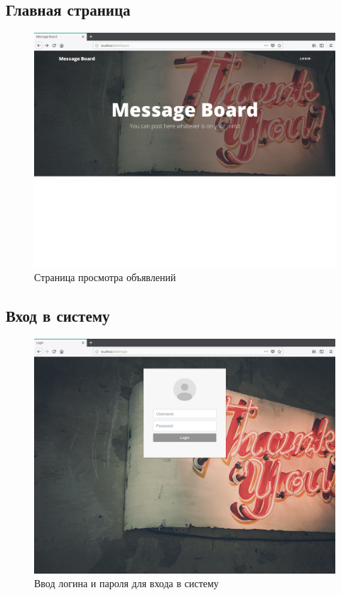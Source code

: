 \documentclass{article}
\begin{document}
    \subsection{Главная страница}
    \begin{figure}[H]
        \begin{flushleft}
            \centerline{\includegraphics[scale=0.4]{board_guest.png}}
            \caption{Страница просмотра объявлений}
        \end{flushleft}
    \end{figure}

    \subsection{Вход в систему}
    \begin{figure}[H]
        \begin{flushleft}
            \centerline{\includegraphics[scale=0.4]{login.png}}
            \caption{Ввод логина и пароля для входа в систему}
        \end{flushleft}
    \end{figure}
\end{document}
